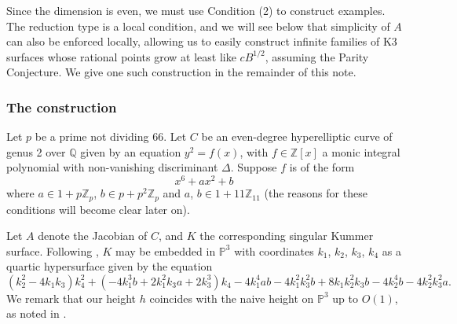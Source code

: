 \documentclass[a4paper,12pt]{amsart}
\begin{document}
Since the dimension is even, we must use Condition (2) to construct examples. The reduction type is a local condition, and we will see below that simplicity of $A$ can also be enforced locally, allowing us to easily construct infinite families of K3 surfaces whose rational points grow at least like $cB^{1/2}$, assuming the Parity Conjecture. We give one such construction in the remainder of this note. 

\subsubsection{The construction}
Let $p$ be a prime not dividing 66. Let $C$ be an even-degree hyperelliptic curve of genus 2 over ${{\mathbb Q}}$ given by an equation
$y^{2} = f(x)$, with $f \in {{\mathbb Z}}[x]$ a monic integral polynomial with non-vanishing discriminant $\Delta$. Suppose $f$ is of the form
\begin{equation}
x^6 + ax^2 + b
\end{equation}
where $a \in 1 + p {{\mathbb Z}}_p$, $b \in p + p^2 {{\mathbb Z}}_p$ and $a$, $b \in 1 + 11 {{\mathbb Z}}_{11}$ (the reasons for these conditions will become clear later on).  

Let $A$ denote the Jacobian of $C$, and $K$ the corresponding singular Kummer surface. Following \cite{flynn_and_smart}, $K$ may be embedded in ${{\mathbb P}}^{3}$ with coordinates $k_1$, $k_2$, $k_3$, $k_4$ as a quartic hypersurface given by the equation
\begin{equation*}
(k_2^2 - 4k_1k_3)k_4^2 + (-4k_1^3 b +2 k_1^2k_3 a + 2k_3^3)k_4 -4k_1^4 a b - 4 k_1^2k_3^2b +8k_1k_2^2k_3b - 4k_2^4b -4k_2^2k_3^2a. 
\end{equation*}
We remark that our height $h$ coincides with the naive height on ${{\mathbb P}}^3$ up to $O(1)$, as noted in \cite{flynn_and_smart}. 
\end{document}

